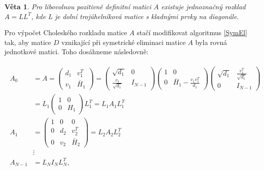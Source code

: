 \documentclass[11pt,american,czech,oneside]{book}
\theoremstyle{plain}
\newtheorem{theorem}{Věta}
\theoremstyle{definition}
\begin{document}
\begin{theorem}
  Pro libovolnou pozitivně definitní matici $A$ existuje jednoznačný rozklad $A=LL^T$, kde L je dolní trojúhelníková matice s kladnými prvky na diagonále.
\end{theorem}

Pro výpočet Choleského rozkladu matice $A$ stačí modifikovat algoritmus \ref{SymEl} tak, aby matice $D$ vznikající při symetrické eliminaci matice $A$ byla rovná jednotkové matici. Toho dosáhneme následovně:

\begin{gather}
\begin{aligned}
\label{Cholesky}
A_0 & = A = \left( \begin{matrix}
               d_1 & v_1^T \\
               v_1 & \bar{H}_1
             \end{matrix} \right)
           =\left(\begin{matrix}
              \sqrt{d_1}      & 0 \\
              \frac{v_1}{\sqrt{d_1}} & I_{N-1}
            \end{matrix} \right)
            \left(\begin{matrix}
              1   & 0 \\
              0   & \bar{H}_1-\frac{v_1v_1^T}{d_1}
            \end{matrix} \right)
            \left(\begin{matrix}
              \sqrt{d_1} & \frac{v_1^T}{\sqrt{d_1}} \\
              0 & I_{N-1}
            \end{matrix} \right) \\
    &     = L_1
            \left(\begin{matrix}
              1 & 0 \\
              0 & H_1
            \end{matrix} \right)
            L_1^T
          = L_1 A_1 L_1^T \\
  A_1 & = \left( \begin{matrix}
               1   &  0   & 0 \\
               0   &  d_2 & v_2^T \\
               0   &  v_2 & \bar{H}_2
             \end{matrix} \right)
        =  L_2 A_2 L_2^T \\
    & \vdots \\
  A_{N-1} & = L_N I_N L_N^T,
\end{aligned}
\end{gather}
\end{document}
